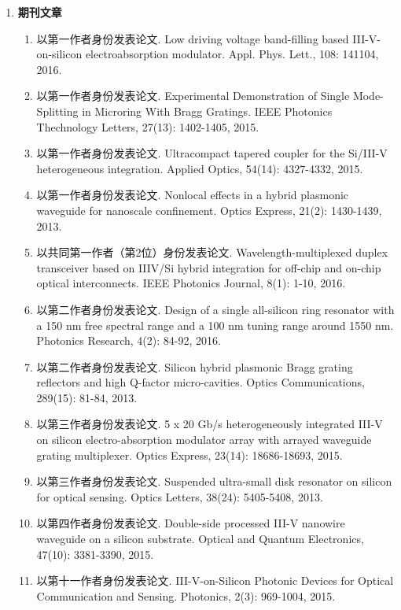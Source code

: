 \begin{publications}
\begin{enumerate}[]
	\item \textbf{期刊文章}
	\begin{enumerate}[1.]
		\item 以第一作者身份发表论文. Low driving voltage band-filling based III-V-on-silicon electroabsorption modulator. Appl. Phys. Lett., 108: 141104, 2016.
		\item 以第一作者身份发表论文. Experimental Demonstration of Single Mode-Splitting in Microring With Bragg Gratings. IEEE Photonics Thechnology Letters, 27(13): 1402-1405, 2015.
		\item 以第一作者身份发表论文. Ultracompact tapered coupler for the Si/III-V heterogeneous integration. Applied Optics, 54(14): 4327-4332, 2015.
		\item 以第一作者身份发表论文. Nonlocal effects in a hybrid plasmonic waveguide for nanoscale confinement. Optics Express, 21(2): 1430-1439, 2013.
		\item 以共同第一作者（第2位）身份发表论文. Wavelength-multiplexed duplex transceiver based on IIIV/Si hybrid integration for off-chip 
		and on-chip optical interconnects. IEEE Photonics Journal, 8(1): 1-10, 2016. 		
		\item 以第二作者身份发表论文. Design of a single all-silicon ring resonator with a 150 nm free spectral range and a 100 nm tuning range around 1550 nm. Photonics Research, 4(2): 84-92, 2016.
		\item 以第二作者身份发表论文. Silicon hybrid plasmonic Bragg grating reflectors and high Q-factor micro-cavities. Optics Communications, 289(15): 81-84, 2013.		
		\item 以第三作者身份发表论文. 5 x 20 Gb/s heterogeneously integrated III-V on silicon electro-absorption modulator array with arrayed waveguide grating multiplexer. Optics Express, 23(14): 18686-18693, 2015.
		\item 以第三作者身份发表论文. Suspended ultra-small disk resonator on silicon for optical sensing. Optics Letters, 38(24): 5405-5408, 2013.
		\item 以第四作者身份发表论文. Double-side processed III-V nanowire waveguide on a silicon substrate. Optical and Quantum Electronics, 47(10): 3381-3390, 2015.
		\item 以第十一作者身份发表论文. III-V-on-Silicon Photonic Devices for Optical Communication and Sensing. Photonics, 2(3): 969-1004, 2015.
	\end{enumerate}

\end{enumerate}
\end{publications}
